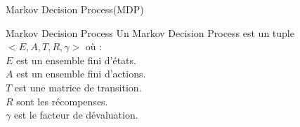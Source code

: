 \begin{frame}{Markov Decision Process(MDP)}{}
	\begin{center}
		\begin{block}{Markov Decision Process}
			Un Markov Decision Process est un tuple $<E,A,T,R,\gamma>$ où :\\
			$E$ est un ensemble fini d'états.\\
			$A$ est un ensemble fini d'actions.\\
			$T$ est une matrice de transition.\\
			$R$ sont les récompenses.\\
			$\gamma$ est le facteur de dévaluation.
		\end{block}
	\end{center}
\end{frame}

